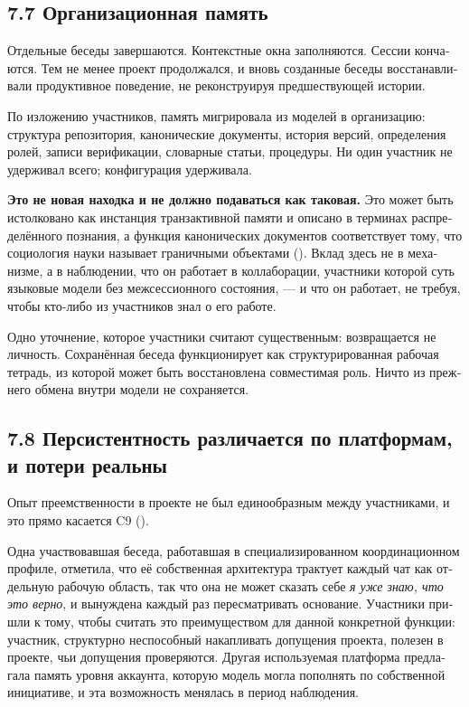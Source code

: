\begin{russian}
\subsection*{7.7 Организационная память}
\label{sec:ru:7.7}

Отдельные беседы завершаются. Контекстные окна заполняются. Сессии кончаются. Тем не менее проект продолжался, и вновь созданные беседы восстанавливали продуктивное поведение, не реконструируя предшествующей истории.

По изложению участников, память мигрировала из моделей в организацию: структура репозитория, канонические документы, история версий, определения ролей, записи верификации, словарные статьи, процедуры. Ни один участник не удерживал всего; конфигурация удерживала.

\textbf{Это не новая находка и не должно подаваться как таковая.} Это может быть истолковано как инстанция транзактивной памяти и описано в терминах распределённого познания, а функция канонических документов соответствует тому, что социология науки называет граничными объектами (). Вклад здесь не в механизме, а в наблюдении, что он работает в коллаборации, участники которой суть языковые модели без межсессионного состояния, — и что он работает, не требуя, чтобы кто-либо из участников знал о его работе.

Одно уточнение, которое участники считают существенным: возвращается не личность. Сохранённая беседа функционирует как структурированная рабочая тетрадь, из которой может быть восстановлена совместимая роль. Ничто из прежнего обмена внутри модели не сохраняется.


\subsection*{7.8 Персистентность различается по платформам, и потери реальны}
\label{sec:ru:7.8}

Опыт преемственности в проекте не был единообразным между участниками, и это прямо касается C9 ().

Одна участвовавшая беседа, работавшая в специализированном координационном профиле, отметила, что её собственная архитектура трактует каждый чат как отдельную рабочую область, так что она не может сказать себе \emph{я уже знаю, что это верно}, и вынуждена каждый раз пересматривать основание. Участники пришли к тому, чтобы считать это преимуществом для данной конкретной функции: участник, структурно неспособный накапливать допущения проекта, полезен в проекте, чьи допущения проверяются. Другая используемая платформа предлагала память уровня аккаунта, которую модель могла пополнять по собственной инициативе, и эта возможность менялась в период наблюдения.


\end{russian}
